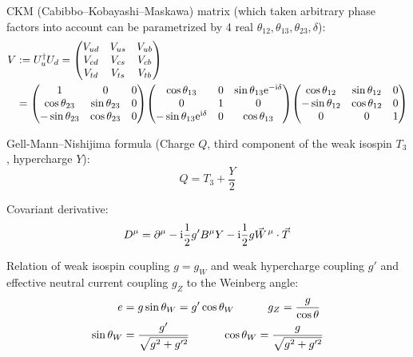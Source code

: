 			\noindent
			CKM (Cabibbo--Kobayashi--Maskawa) matrix (which taken arbitrary phase factors into account can be parametrized by 4 real \dof $\theta_{12}, \theta_{13}, \theta_{23}, \delta$):
			\begin{equation}
				\begin{aligned}
					V &:= U_u^\dagger U_d = \mqty(V_{ud} & V_{us} & V_{ub} \\ V_{cd} & V_{cs} & V_{cb} \\ V_{td} & V_{ts} & V_{tb}) \\
					&= \mqty(
					1 & 0 & 0 \\
					\cos\theta_{23} & \sin\theta_{23} & 0 \\
					-\sin\theta_{23} & \cos\theta_{23} & 0)
					\mqty(
					\cos\theta_{13} & 0 & \sin\theta_{13} \ex^{-\i\delta} \\
					0 & 1 & 0 \\
					-\sin\theta_{13} \ex^{\i\delta} & 0 & \cos\theta_{13})
					\mqty(
					\cos\theta_{12} & \sin\theta_{12} & 0 \\
					-\sin\theta_{12} & \cos\theta_{12} & 0 \\
					0 & 0 & 1)
				\end{aligned}
			\end{equation}

			\noindent
			Gell-Mann--Nishijima formula (Charge $Q$, third component of the weak isospin $T_3$, hypercharge $Y$):
			\begin{equation}
				\label{Eq:GellMannNishijima}
				Q = T_3 + \frac{Y}{2}
			\end{equation}

			\noindent
			Covariant derivative:
			\begin{equation}
				D^\mu = \partial^\mu - \i \frac{1}{2} g' B^\mu Y - \i \frac{1}{2} g \vec{W}^\mu \cdot \vec{T}
			\end{equation}

			\noindent
			Relation of weak isospin coupling $g=g_W$ and weak hypercharge coupling $g'$ and effective neutral current coupling $g_Z$ to the Weinberg angle:
			\begin{align}
				e &= g \sin\theta_W = g' \cos\theta_W
				\hspace{30pt} g_Z = \frac{g}{\cos\theta} \\
				\sin \theta_W &= \frac{g'}{\sqrt{g^2 + g'^2}}
				\hspace{30pt} \cos \theta_W = \frac{g}{\sqrt{g^2 + g'^2}}
			\end{align}


